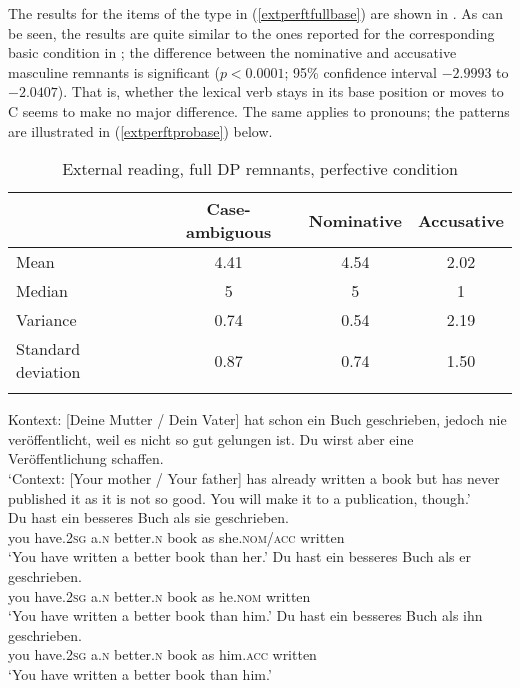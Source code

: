 The results for the items of the type in (\ref{extperftfullbase}) are shown in .
As can be seen, the results are quite similar to the ones reported for the corresponding basic condition in ; the difference between the nominative and accusative masculine remnants is significant ($p<0.0001$; 95\% confidence interval $-2.9993$ to $-2.0407$). That is, whether the lexical verb stays in its base position or moves to C seems to make no major difference. The same applies to pronouns; the patterns are illustrated in (\ref{extperftprobase}) below.

\begin{table}
\begin{tabular}{l *3{S[table-format=1.2]}}
\lsptoprule
{} & {Case-ambiguous} & {Nominative} & {Accusative}\\
\midrule
Mean & 4.41 & 4.54 & 2.02\\
Median & 5 & 5 & 1\\
Variance & 0.74 & 0.54 & 2.19\\
Standard deviation & 0.87 & 0.74 & 1.50\\
\lspbottomrule
\end{tabular}
\caption{External reading, full DP remnants, perfective condition}
\label{tableextperftfullbase}
\end{table} 


\ea Kontext: [Deine Mutter / Dein Vater] hat schon ein Buch geschrieben, jedoch nie veröffentlicht, weil es nicht so gut gelungen ist. Du wirst aber eine Veröffentlichung schaffen. \label{extperftprobase}\\
`Context: [Your mother / Your father] has already written a book but has never published it as it is not so good. You will make it to a publication, though.'\\
\ea \gll Du hast ein besseres Buch als sie geschrieben. \label{extperftprobaseambig}\\
you have.\textsc{2sg} a.\textsc{n} better.\textsc{n} book as she.\textsc{nom/acc} written\\
\glt `You have written a better book than her.'
\ex \gll Du hast ein besseres Buch als er geschrieben. \label{extperftprobasenom}\\
you have.\textsc{2sg} a.\textsc{n} better.\textsc{n} book as he.\textsc{nom} written\\
\glt `You have written a better book than him.'
\ex \gll Du hast ein besseres Buch als ihn geschrieben. \label{extperftprobaseacc}\\
you have.\textsc{2sg} a.\textsc{n} better.\textsc{n} book as him.\textsc{acc} written\\
\glt `You have written a better book than him.'
\z
\z

